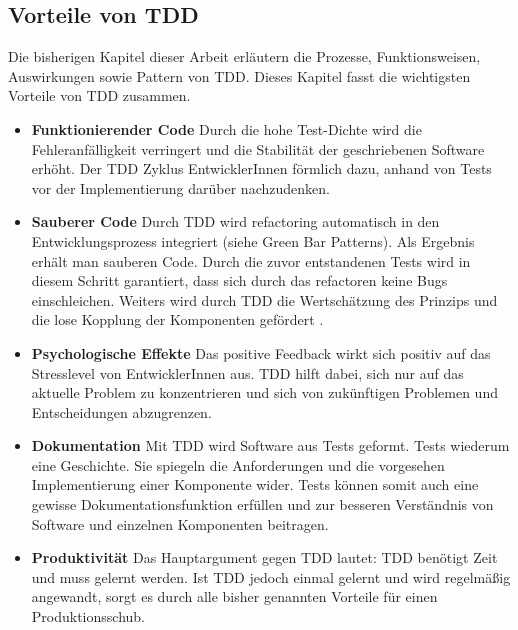 \subsection{Vorteile von TDD}
\label{Vorteile von TDD}
Die bisherigen Kapitel dieser Arbeit erläutern die Prozesse, Funktionsweisen, Auswirkungen sowie Pattern von TDD. Dieses Kapitel fasst die wichtigsten Vorteile von TDD zusammen.
\begin{itemize}
  \item \textbf{Funktionierender Code}\newline
  Durch die hohe Test-Dichte wird die Fehleranfälligkeit verringert und die Stabilität der geschriebenen Software erhöht. Der TDD Zyklus  EntwicklerInnen förmlich dazu, anhand von Tests vor der Implementierung darüber nachzudenken.
  \item \textbf{Sauberer Code}\newline
  Durch TDD wird refactoring automatisch in den Entwicklungsprozess integriert (siehe Green Bar Patterns). Als Ergebnis erhält man sauberen Code. Durch die zuvor entstandenen Tests wird in diesem Schritt garantiert, dass sich durch das refactoren keine Bugs einschleichen. Weiters wird durch TDD die Wertschätzung des  Prinzips und die lose Kopplung der Komponenten gefördert \autocite[30]{Johansen:2011}.
  \item \textbf{Psychologische Effekte}\newline
  Das positive Feedback wirkt sich positiv auf das Stresslevel von EntwicklerInnen aus.
  TDD hilft dabei, sich nur auf das aktuelle Problem zu konzentrieren und sich von zukünftigen Problemen und Entscheidungen abzugrenzen.
  \item \textbf{Dokumentation}\newline
  Mit TDD wird Software aus Tests geformt. Tests wiederum  eine Geschichte. Sie spiegeln die Anforderungen und die vorgesehen Implementierung einer Komponente wider. Tests können somit auch eine gewisse Dokumentationsfunktion erfüllen und zur besseren Verständnis von Software und einzelnen Komponenten beitragen.
  \item \textbf{Produktivität}\newline
  Das Hauptargument gegen TDD lautet: TDD benötigt Zeit und muss gelernt werden.
  Ist TDD jedoch einmal gelernt und wird regelmäßig angewandt, sorgt es durch alle bisher genannten Vorteile für einen Produktionsschub.
\end{itemize}

